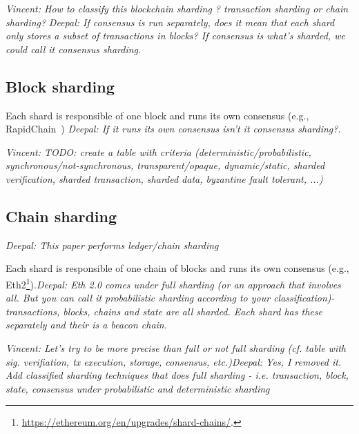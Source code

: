 \documentclass[11pt,dvipdfm]{article}
\newcommand{\vincent}[1]{\emph{Vincent: #1}}%
\newcommand{\deepal}[1]{\emph{Deepal: #1}}%
\begin{document}
{\vincent{How to classify this blockchain sharding \cite{AAE19}? transaction sharding or chain sharding?}
\deepal{If consensus is run separately, does it mean that each shard only stores a subset of transactions in blocks? If consensus is what's sharded, we could call it consensus sharding.}
\subsection{Block sharding} 
Each shard is responsible of one block and runs its own consensus (e.g., RapidChain~\cite{ZMR18}) \deepal{If it runs its own consensus isn't it consensus sharding?}.

\vincent{TODO: create a table with criteria (deterministic/probabilistic, synchronous/not-synchronous, transparent/opaque, dynamic/static, sharded verification, sharded transaction, sharded data, byzantine fault tolerant, ...)}

\subsection{Chain sharding}
\deepal{This paper performs ledger/chain sharding~\cite{8946272}}

Each shard is responsible of one chain of blocks and runs its own consensus (e.g., Eth2\footnote{\url{https://ethereum.org/en/upgrades/shard-chains/}.}).\deepal{Eth 2.0 comes under full sharding (or an approach that involves all. But you can call it probabilistic sharding according to your classification)- transactions, blocks, chains and state are all sharded. Each shard has these separately and their is a beacon chain.}

\vincent{Let's try to be more precise than full or not full sharding (cf. table with sig. verifiation, tx execution, storage, consensus, etc.)}\deepal{Yes, I removed it. Add classified sharding techniques that does full sharding - i.e. transaction, block, state, consensus under probabilistic and deterministic sharding}








}
\end{document}
